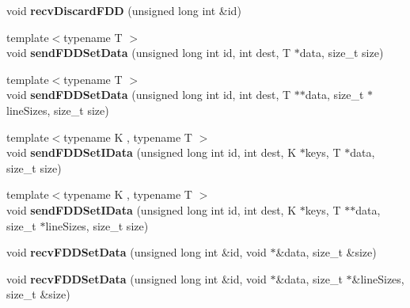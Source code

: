 \begin{DoxyCompactItemize}
\item 
\hypertarget{classfaster_1_1fastComm_aaa0a11dcde70a8dcf39b0773c9c15d43}{}void {\bfseries recv\+Discard\+F\+D\+D} (unsigned long int \&id)\label{classfaster_1_1fastComm_aaa0a11dcde70a8dcf39b0773c9c15d43}

\item 
\hypertarget{classfaster_1_1fastComm_acc7534571a62d6df7c4f7a13d69b9e41}{}{\footnotesize template$<$typename T $>$ }\\void {\bfseries send\+F\+D\+D\+Set\+Data} (unsigned long int id, int dest, T $\ast$data, size\+\_\+t size)\label{classfaster_1_1fastComm_acc7534571a62d6df7c4f7a13d69b9e41}

\item 
\hypertarget{classfaster_1_1fastComm_a71e3ddff08c78a0a0e4cfb03f3ebf63c}{}{\footnotesize template$<$typename T $>$ }\\void {\bfseries send\+F\+D\+D\+Set\+Data} (unsigned long int id, int dest, T $\ast$$\ast$data, size\+\_\+t $\ast$line\+Sizes, size\+\_\+t size)\label{classfaster_1_1fastComm_a71e3ddff08c78a0a0e4cfb03f3ebf63c}

\item 
\hypertarget{classfaster_1_1fastComm_aeaf4e75975319f16c3c9544b8ab9309e}{}{\footnotesize template$<$typename K , typename T $>$ }\\void {\bfseries send\+F\+D\+D\+Set\+I\+Data} (unsigned long int id, int dest, K $\ast$keys, T $\ast$data, size\+\_\+t size)\label{classfaster_1_1fastComm_aeaf4e75975319f16c3c9544b8ab9309e}

\item 
\hypertarget{classfaster_1_1fastComm_aa1937f0dfe57c88c95c3c03596df3298}{}{\footnotesize template$<$typename K , typename T $>$ }\\void {\bfseries send\+F\+D\+D\+Set\+I\+Data} (unsigned long int id, int dest, K $\ast$keys, T $\ast$$\ast$data, size\+\_\+t $\ast$line\+Sizes, size\+\_\+t size)\label{classfaster_1_1fastComm_aa1937f0dfe57c88c95c3c03596df3298}

\item 
\hypertarget{classfaster_1_1fastComm_aa370d793025cbed0d74391a8e6dccf46}{}void {\bfseries recv\+F\+D\+D\+Set\+Data} (unsigned long int \&id, void $\ast$\&data, size\+\_\+t \&size)\label{classfaster_1_1fastComm_aa370d793025cbed0d74391a8e6dccf46}

\item 
\hypertarget{classfaster_1_1fastComm_abe5fb47fb54ef8bea608eec1ccbbcae6}{}void {\bfseries recv\+F\+D\+D\+Set\+Data} (unsigned long int \&id, void $\ast$\&data, size\+\_\+t $\ast$\&line\+Sizes, size\+\_\+t \&size)\label{classfaster_1_1fastComm_abe5fb47fb54ef8bea608eec1ccbbcae6}


\end{DoxyCompactItemize}
